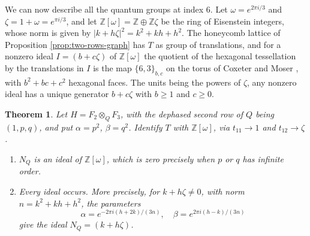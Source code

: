 \documentclass[11pt,reqno]{amsart}
\newtheorem{thm}{Theorem}[section]
\theoremstyle{definition}
\numberwithin{equation}{section}
\begin{document}
We can now describe all the quantum groups at index 6. Let $\omega=e^{2\pi i/3}$ and $\zeta=1+\omega=e^{\pi i/3}$, and let $\mathbb Z[\omega]=\mathbb Z\oplus\mathbb Z\zeta$ be the ring of Eisenstein integers, whose norm is given by $|k+h\zeta|^2=k^2+kh+h^2$. The honeycomb lattice of Proposition \ref{prop:two-rows-graph} has $T$ as group of translations, and for a nonzero ideal $I=(b+c\zeta)$ of $\mathbb Z[\omega]$ the quotient of the hexagonal tessellation by the translations in $I$ is the map $\{6,3\}_{b,c}$ on the torus of Coxeter and Moser \cite{CM80}, with $b^2+bc+c^2$ hexagonal faces. The units being the powers of $\zeta$, any nonzero ideal has a unique generator $b+c\zeta$ with $b\geq1$ and $c\geq0$.

\begin{thm}\label{thm:eisenstein}
Let $H=F_2\otimes_QF_3$, with the dephased second row of $Q$ being $(1,p,q)$, and put $\alpha=p^2$, $\beta=q^2$. Identify $T$ with $\mathbb Z[\omega]$, via $t_{11}\to1$ and $t_{12}\to\zeta$.
\begin{enumerate}
\item $N_Q$ is an ideal of $\mathbb Z[\omega]$, which is zero precisely when $p$ or $q$ has infinite order.

\item Every ideal occurs. More precisely, for $k+h\zeta\neq0$, with norm $n=k^2+kh+h^2$, the parameters
$$\alpha=e^{-2\pi i(h+2k)/(3n)},\quad\beta=e^{2\pi i(h-k)/(3n)}$$
give the ideal $N_Q=(k+h\zeta)$.
\end{enumerate}
\end{thm}
\end{document}
